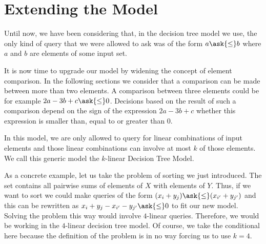 \section{Extending the Model}

Until now, we have been considering that, in the decision tree
model we use, the only kind of query that we were allowed to ask was of the
form \(a \ask{\le} b \) where \(a\) and \(b\) are elements of some input set.

It is now time to upgrade our model by widening the concept of element
comparison. In the following sections we consider that a comparison can be made
between more than two elements. A comparison between three elements could be
for example \(2a - 3b + c \ask{\le} 0\). Decisions based on the result of such
a comparison depend on the sign of the expression \(2a - 3b + c\) \ie whether
this expression is smaller than, equal to or greater than \(0\).

In this model, we are only allowed to query for linear combinations of
input elements and those linear combinations can involve at most \(k\) of those
elements. We call this generic model the \(k\)-linear Decision Tree Model.

As a concrete example, let us take the problem of sorting \XY we just introduced.
The set \XY contains all pairwise sums of elements of \(X\) with elements of
\(Y\). Thus, if we want to sort \XY we could make queries of the form \((x_i +
y_j) \ask{\le} (x_{i'} + y_{j'})\) and this can be rewritten as \( x_i +
y_j - x_{i'} - y_{j'} \ask{\le} 0\) to fit our new model. Solving the problem
this way would involve \(4\)-linear queries. Therefore, we would be working in
the \(4\)-linear decision tree model. Of course, we take the conditional here
because the definition of the problem is in no way forcing us to use \(k=4\).
